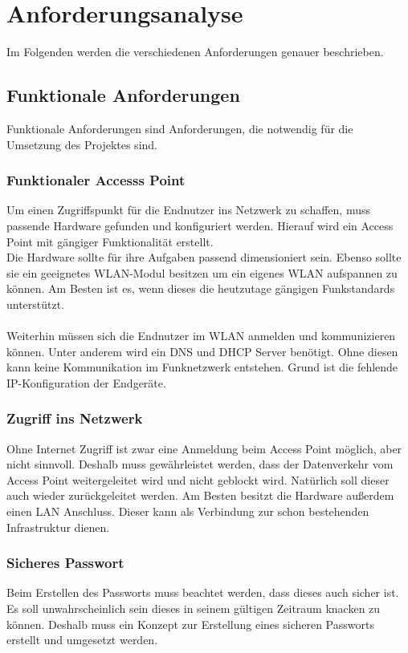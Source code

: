 \documentclass[a4paper,11pt,singlespacing]{article}
\begin{document}
   \section{Anforderungsanalyse}
    		Im Folgenden werden die verschiedenen Anforderungen genauer beschrieben.
			\subsection{Funktionale Anforderungen}
			Funktionale Anforderungen sind Anforderungen, die notwendig für die Umsetzung des Projektes sind.
            \subsubsection{Funktionaler Accesss Point}
                Um einen Zugriffspunkt für die Endnutzer ins Netzwerk zu schaffen, muss passende Hardware gefunden und konfiguriert werden. Hierauf wird ein Access Point mit gängiger Funktionalität erstellt.\\ 
                Die Hardware sollte für ihre Aufgaben passend dimensioniert sein. Ebenso sollte sie ein geeignetes WLAN-Modul besitzen um ein eigenes WLAN aufspannen zu können. Am Besten ist es, wenn dieses die heutzutage gängigen Funkstandards unterstützt.\\\\
                Weiterhin müssen sich die Endnutzer im WLAN anmelden und kommunizieren können. Unter anderem wird ein DNS und DHCP Server benötigt. Ohne diesen kann keine Kommunikation im Funknetzwerk entstehen. Grund ist die fehlende IP-Konfiguration der Endgeräte.
                \subsubsection{Zugriff ins Netzwerk}
                    Ohne Internet Zugriff ist zwar eine Anmeldung beim Access Point möglich, aber nicht sinnvoll.
                    Deshalb muss gewährleistet werden, dass der Datenverkehr vom Access Point weitergeleitet wird und nicht geblockt wird. Natürlich soll dieser auch wieder zurückgeleitet werden. Am Besten besitzt die Hardware außerdem einen LAN Anschluss. Dieser kann als Verbindung zur schon bestehenden Infrastruktur dienen.
                \subsubsection{Sicheres Passwort}
                    Beim Erstellen des Passworts muss beachtet werden, dass dieses auch sicher ist. Es soll unwahrscheinlich sein dieses in seinem gültigen Zeitraum knacken zu können. Deshalb muss ein Konzept zur Erstellung eines sicheren Passworts erstellt und umgesetzt werden. 
\end{document}
